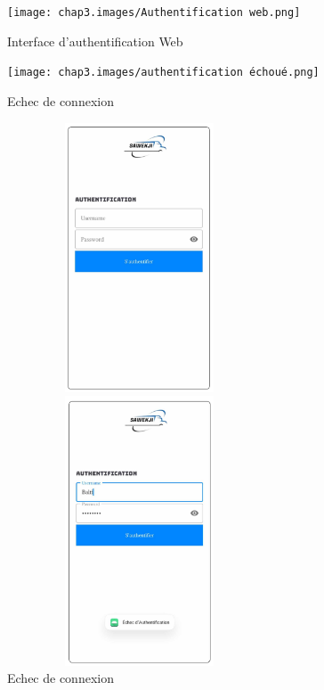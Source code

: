 \begin{figure}[ht!]
  \centering
  \texttt{[image: chap3.images/Authentification web.png]}
  \caption{Interface d'authentification Web }

\end{figure}
\begin{figure}[ht!]
  \centering
  \texttt{[image: chap3.images/authentification échoué.png]}
  \caption{Echec de connexion }

\end{figure}


\newpage

\begin{figure}[htbp]
  \centering
  \begin{minipage}{0.45\textwidth}
    \centering
    \includegraphics[width=0.7\textwidth,height=8cm]{chap3.images/authentfication mob.png}
    \caption{}

  \end{minipage}
  \hfill
  \begin{minipage}{0.45\textwidth}
    \centering
    \includegraphics[width=0.7\textwidth,height=8cm]{chap3.images/echec authentification mob.png}
    \caption{Echec de connexion }

  \end{minipage}
\end{figure}


